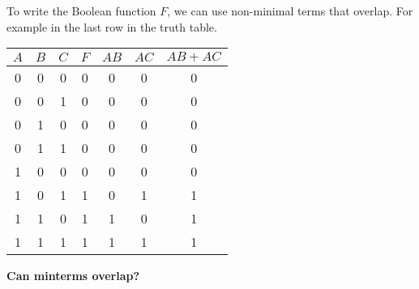 


\begin{frame}[fragile]

\begin{tcolorbox}[enhanced,attach boxed title to top center={yshift=-3mm,yshifttext=-1mm},
  colback=blue!5!white,colframe=blue!75!black,colbacktitle=blue!80!black,
  title=Think About It,fonttitle=\bfseries,
  boxed title style={size=small,colframe=red!50!black} ]
  To write the Boolean function $F$, we can use non-minimal terms that overlap. For example in the last row in the truth table.
	\begin{center}
\begin{tabular}{ccc|c|cc|c}
$A$&$B$&$C$ & $F$ & $A B$ & $A C$& $A B + A C$ \\\hline
0&0&0 & 0 & 0 & 0 & 0 \\
0&0&1 & 0 & 0 & 0 & 0 \\
0&1&0 & 0 & 0 & 0 & 0 \\
0&1&1 & 0 & 0 & 0 & 0 \\
1&0&0 & 0 & 0 & 0 & 0 \\
1&0&1 & 1 & 0 & 1 & 1 \\
1&1&0 & 1 & 1 & 0 & 1 \\
1&1&1 & 1 & 1 & 1 & 1 \\
\end{tabular}
\end{center}
\textbf{Can minterms overlap?} \ifnum{}\fi
\end{tcolorbox}



\end{frame}
